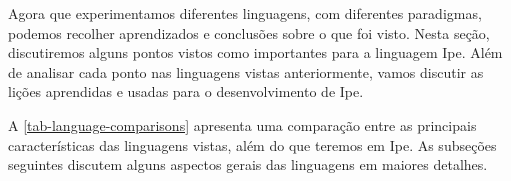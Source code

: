 Agora que experimentamos diferentes linguagens, com diferentes paradigmas, podemos
recolher aprendizados e conclusões sobre o que foi visto. Nesta seção, discutiremos
alguns pontos vistos como importantes para a linguagem Ipe. Além de analisar cada
ponto nas linguagens vistas anteriormente, vamos discutir as lições aprendidas e
usadas para o desenvolvimento de Ipe.

A \autoref{tab-language-comparisons} apresenta uma comparação entre as
principais características das linguagens vistas, além do que teremos em Ipe. As
subseções seguintes discutem alguns aspectos gerais das linguagens em maiores detalhes.

\begin{table}[htb]
  \caption{Principais características das linguagens analisadas e de Ipe. O nível de temor, determinado por \cite{stackoverflowsurvey}, mede o quão temida é a linguagem.}
  \label{tab-language-comparisons}
\end{table}

